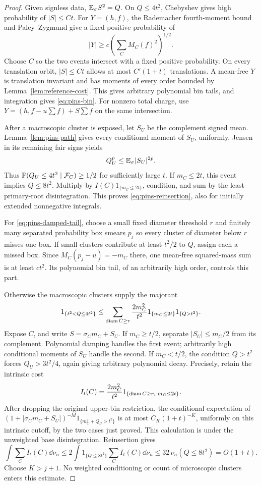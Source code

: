 \begin{proof}
Given signless data, \(\mathbb E_\sigma S^2=Q\).
On \(Q\le4t^2\), Chebyshev gives high probability of
\(|S|\le Ct\). For \(Y=(h,f)\), the Rademacher fourth-moment
bound and Paley--Zygmund give a fixed positive probability of
\[
             |Y|\ge c\left(\sum_CM_C(f)^2\right)^{1/2}.
\]
Choose \(C\) so the two events intersect with a fixed positive
probability. On every translation orbit, \(|S|\le Ct\)
allows at most \(C'(1+t)\) translations. A mean-free \(Y\) is
translation invariant and has moments of every order bounded by
Lemma~\ref{lem:reference-cost}. This gives arbitrary polynomial
bin tails, and integration gives \eqref{eq:pins-bin}. For
nonzero total charge, use
\(Y=(h,f-u\sum f)+S\sum f\) on the same intersection.

After a macroscopic cluster is exposed, let \(S_U\) be the
complement signed mean. Lemma~\ref{lem:pins-path} gives every
conditional moment of \(S_U\), uniformly. Jensen in its remaining
fair signs yields
\[
 Q_U^p\le\mathbb E_\sigma|S_U|^{2p}.
\]
Thus \(\mathbb P(Q_U\le4t^2\mid\mathcal F_C)\ge1/2\) for
sufficiently large \(t\). If \(m_C\le2t\), this event implies
\(Q\le8t^2\). Multiply by \(I(C)1_{\{m_C\le2t\}}\), condition,
and sum by the least-primary-root disintegration. This proves
\eqref{eq:pins-reinsertion}, also for initially extended
nonnegative integrals.

For \eqref{eq:pins-damped-tail}, choose a small fixed diameter
threshold \(r\) and finitely many separated probability box
smears \(p_j\) so every cluster of diameter below \(r\) misses
one box. If small clusters contribute at least \(t^2/2\) to
\(Q\), assign each a missed box. Since
\(M_C(p_j-u)=-m_C\) there, one mean-free squared-mass sum is
at least \(ct^2\). Its polynomial bin tail, of an arbitrarily
high order, controls this part.

Otherwise the macroscopic clusters supply the majorant
\[
 1_{\{t^2<Q\le4t^2\}}
 \le\sum_{\operatorname{diam} C\ge r}
       \frac{2m_C^2}{t^2}1_{\{m_C\le2t\}}1_{\{Q>t^2\}}.
\]
Expose \(C\), and write \(S=\sigma_Cm_C+S_U\).
If \(m_C\ge t/2\), separate \(|S_U|\le m_C/2\)
from its complement. Polynomial damping handles the first event;
arbitrarily high conditional moments of \(S_U\) handle the
second. If \(m_C<t/2\), the condition \(Q>t^2\) forces
\(Q_U>3t^2/4\), again giving arbitrary polynomial decay.
Precisely, retain the intrinsic cost
\[
 I_t(C)=\frac{2m_C^2}{t^2}
              1_{\{\operatorname{diam} C\ge r,\ m_C\le2t\}}.
\]
After dropping the original upper-bin restriction, the
conditional expectation of
\((1+|\sigma_Cm_C+S_U|)^{-M}1_{\{m_C^2+Q_U>t^2\}}\)
is at most \(C_K(1+t)^{-K}\), uniformly on this intrinsic
cutoff, by the two cases just proved. This calculation is
under the unweighted base disintegration. Reinsertion gives
\[
 \int\sum_C I_t(C)\dd\nu_n
 \le2\int1_{\{Q\le8t^2\}}\sum_CI_t(C)\dd\nu_n
 \le32\,\nu_n(Q\le8t^2)=O(1+t).
\]
Choose \(K>j+1\). No weighted conditioning or count of
microscopic clusters enters this estimate.
\end{proof}

